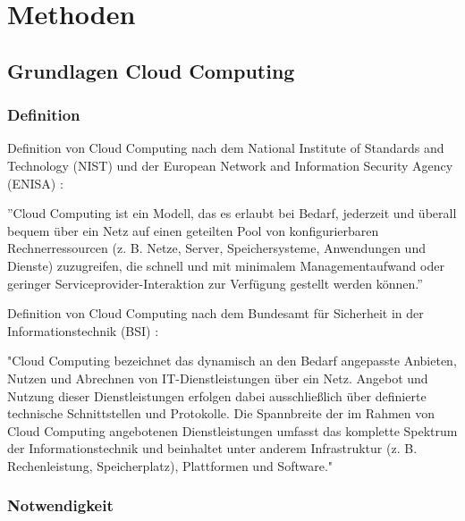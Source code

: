 \documentclass[12pt,a4paper,bibliography=totocnumbered,listof=totocnumbered]{scrartcl}
\begin{document}
\section{Methoden}
\subsection{Grundlagen Cloud Computing}
\subsubsection{Definition}
Definition von Cloud Computing nach dem National Institute of Standards and Technology (NIST) und der European Network and Information Security Agency (ENISA) \cite{34}:

''Cloud Computing ist ein Modell, das es erlaubt bei Bedarf, jederzeit und überall bequem über ein Netz auf einen geteilten Pool von konfigurierbaren Rechnerressourcen (z. B. Netze, Server, Speichersysteme, Anwendungen und Dienste) zuzugreifen, die schnell und mit minimalem Managementaufwand oder geringer Serviceprovider-Interaktion zur Verfügung gestellt werden können.''

Definition von Cloud Computing nach dem Bundesamt für Sicherheit in der Informationstechnik (BSI) \cite{35}:

"Cloud Computing bezeichnet das dynamisch an den Bedarf angepasste Anbieten, Nutzen und Abrechnen von IT-Dienstleistungen über ein Netz. Angebot und Nutzung dieser Dienstleistungen erfolgen dabei ausschließlich über definierte technische Schnittstellen und Protokolle. Die Spannbreite der im Rahmen von Cloud Computing angebotenen Dienstleistungen umfasst das komplette Spektrum der Informationstechnik und beinhaltet unter anderem Infrastruktur (z. B. Rechenleistung, Speicherplatz), Plattformen und Software."

\subsubsection{Notwendigkeit}
\cite{33}
\end{document}
